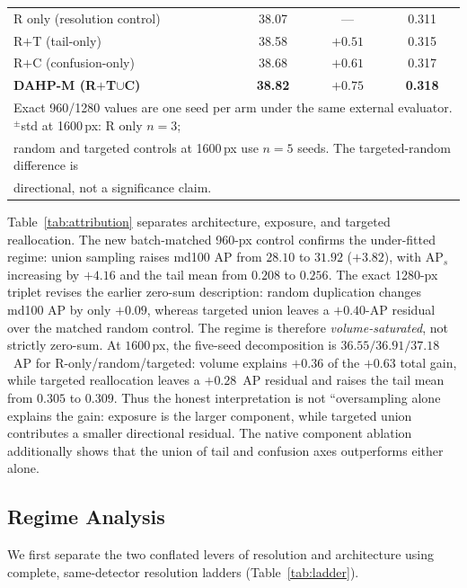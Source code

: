 \documentclass[journal]{IEEEtran}
\newcommand{\ap}{\textup{AP}}
\newcommand{\aps}{\ensuremath{\mathrm{AP}_{s}}}
\newcommand{\dahpM}{DAHP-M}
\begin{document}
\begin{table}[!t]
{\begin{tabular}{lccc}
R only (resolution control) & 38.07 & --- & 0.311 \\
R$+$T (tail-only) & 38.58 & $+0.51$ & 0.315 \\
R$+$C (confusion-only) & 38.68 & $+0.61$ & 0.317 \\
\textbf{\dahpM{} (R$+$T$\cup$C)} & \textbf{38.82} & $+0.75$ & \textbf{0.318} \\
\bottomrule
\multicolumn{4}{l}{\footnotesize Exact 960/1280 values are one seed per arm under the same external evaluator. $^{\pm}$std at 1600\,px: R only $n{=}3$;}\\
\multicolumn{4}{l}{\footnotesize random and targeted controls at 1600\,px use $n{=}5$ seeds. The targeted-random difference is}\\
\multicolumn{4}{l}{\footnotesize directional, not a significance claim.}
\end{tabular}}
\end{table}
Table~\ref{tab:attribution} separates architecture, exposure, and targeted reallocation. The new batch-matched 960-px control confirms the under-fitted regime: union sampling raises md100 \ap{} from $28.10$ to $31.92$ ($+3.82$), with \aps{} increasing by $+4.16$ and the tail mean from $0.208$ to $0.256$. The exact 1280-px triplet revises the earlier zero-sum description: random duplication changes md100 \ap{} by only $+0.09$, whereas targeted union leaves a $+0.40$-\ap{} residual over the matched random control. The regime is therefore \emph{volume-saturated}, not strictly zero-sum. At $1600$\,px, the five-seed decomposition is $36.55/36.91/37.18$~\ap{} for R-only/random/targeted: volume explains $+0.36$ of the $+0.63$ total gain, while targeted reallocation leaves a $+0.28$~\ap{} residual and raises the tail mean from $0.305$ to $0.309$. Thus the honest interpretation is not ``oversampling alone explains the gain: exposure is the larger component, while targeted union contributes a smaller directional residual. The native component ablation additionally shows that the union of tail and confusion axes outperforms either alone.

\subsection{Regime Analysis}
\label{sec:regime}
We first separate the two conflated levers of resolution and architecture using complete, same-detector resolution ladders (Table~\ref{tab:ladder}).
\end{document}
